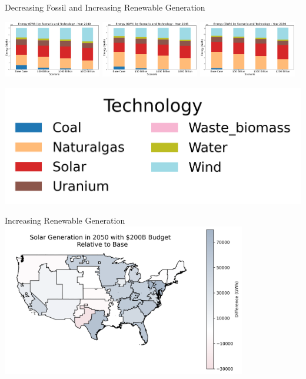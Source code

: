 \documentclass{beamer}
\begin{document}
\begin{frame}{Decreasing Fossil and Increasing Renewable Generation}
\begin{adjustwidth}{-3em}{-1.5em}
    \begin{minipage}{1.1\textwidth}
        \centering
        \includegraphics[width=0.32\textwidth]{Figures/EndogenousPaper/Dispatch_Relative_by_scenario_2040.png} \hfill
        \includegraphics[width=0.32\textwidth]{Figures/EndogenousPaper/Dispatch_Relative_by_scenario_2045.png} \hfill
        \includegraphics[width=0.32\textwidth]{Figures/EndogenousPaper/Dispatch_Relative_by_scenario_2050.png}
    \end{minipage}
\end{adjustwidth}
\includegraphics[scale=.3]{Figures/EndogenousPaper/Legend_2050.png}
\end{frame}


\begin{frame}{Increasing Renewable Generation}
    \centering
    \includegraphics[width=0.8\textwidth]{Figures/EndogenousPaper/solar_generation_map.png}
\end{frame}
\end{document}
